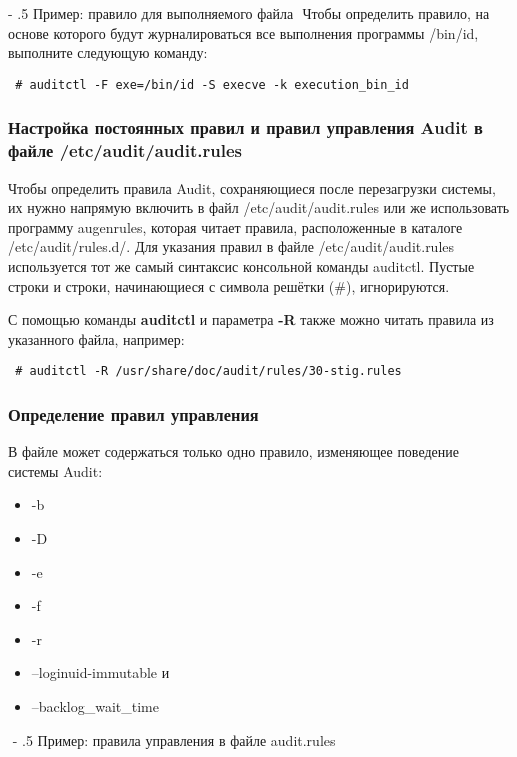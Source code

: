 \documentclass[a4paper,10pt,twoside]{article}
\makeatletter
\renewcommand\paragraph{%
   \@startsection{paragraph}{4}{0mm}%
      {-\baselineskip}%
      {.5\baselineskip}%
      {\normalfont\normalsize\bfseries}}
\makeatother
\begin{document}
\paragraph{Пример: правило для выполняемого файла}
⁠
Чтобы определить правило, на основе которого будут журналироваться все выполнения программы /bin/id, выполните следующую команду:
\begin{verbatim}
 # auditctl -F exe=/bin/id -S execve -k execution_bin_id
\end{verbatim} 



\subsubsection{Настройка постоянных правил и правил управления Audit в файле /etc/audit/audit.rules}
Чтобы определить правила Audit, сохраняющиеся после перезагрузки системы, их нужно напрямую включить в файл /etc/audit/audit.rules или же использовать программу augenrules, которая читает правила, расположенные в каталоге /etc/audit/rules.d/. Для указания правил в файле /etc/audit/audit.rules используется тот же самый синтаксис консольной команды auditctl. Пустые строки и строки, начинающиеся с символа решётки (\#), игнорируются.

 С помощью команды \textbf{auditctl} и параметра \textbf{-R} также можно читать правила из указанного файла, например:

\begin{verbatim}
 # auditctl -R /usr/share/doc/audit/rules/30-stig.rules
\end{verbatim}    


\subsubsection{Определение правил управления}

В файле может содержаться только одно правило, изменяющее поведение системы Audit:   
\begin{itemize}
 \item -b
 \item -D 
 \item -e
 \item -f
 \item -r
 \item --loginuid-immutable и 
 \item --backlog\_wait\_time
\end{itemize}

 
⁠
\paragraph{Пример: правила управления в файле audit.rules}
\end{document}

